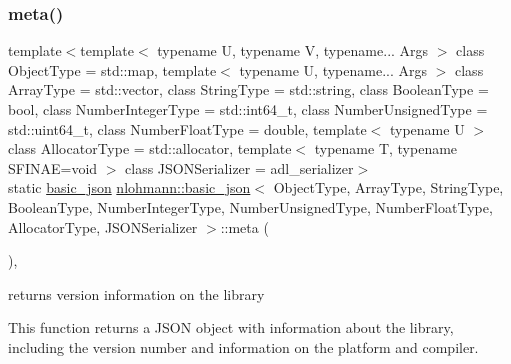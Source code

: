 \subsubsection{\texorpdfstring{meta()}{meta()}}
{\footnotesize\ttfamily template$<$template$<$ typename U, typename V, typename... Args $>$ class Object\+Type = std\+::map, template$<$ typename U, typename... Args $>$ class Array\+Type = std\+::vector, class String\+Type  = std\+::string, class Boolean\+Type  = bool, class Number\+Integer\+Type  = std\+::int64\+\_\+t, class Number\+Unsigned\+Type  = std\+::uint64\+\_\+t, class Number\+Float\+Type  = double, template$<$ typename U $>$ class Allocator\+Type = std\+::allocator, template$<$ typename T, typename S\+F\+I\+N\+A\+E=void $>$ class J\+S\+O\+N\+Serializer = adl\+\_\+serializer$>$ \\
static \mbox{\hyperlink{classnlohmann_1_1basic__json}{basic\+\_\+json}} \mbox{\hyperlink{classnlohmann_1_1basic__json}{nlohmann\+::basic\+\_\+json}}$<$ Object\+Type, Array\+Type, String\+Type, Boolean\+Type, Number\+Integer\+Type, Number\+Unsigned\+Type, Number\+Float\+Type, Allocator\+Type, J\+S\+O\+N\+Serializer $>$\+::meta (\begin{DoxyParamCaption}{ }\end{DoxyParamCaption})\hspace{0.3cm}{\ttfamily [inline]}, {\ttfamily [static]}}



returns version information on the library 

This function returns a J\+S\+ON object with information about the library, including the version number and information on the platform and compiler.

